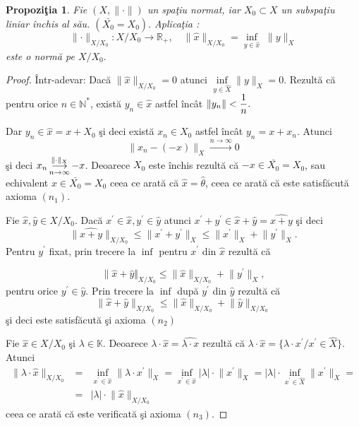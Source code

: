 \documentclass[ a4paper, 12pt]{report}
\newtheorem{prop}[theorem]{\bf Propozi\c tia }
\theoremstyle{definition}
\theoremstyle{remark}
\numberwithin{equation}{section}
\begin{document}
\begin{prop}
Fie $(X,\lVert \cdot \rVert)$ un spa\c tiu normat, iar $X_0 \subset X$ un subspa\c tiu liniar \^inchis al s\u au. $(\bar{X_0} = X_0).$ Aplica\c tia :$$\lVert \cdot \rVert_{X/X_0} : X/X_0 \rightarrow \mathbb{R}_{+}, \quad \lVert \hat{x} \rVert_{X/X_0} = \inf\limits_{y \in \hat{x}} \; \lVert y \rVert_{X} $$ este o norm\u a pe $X/X_0.$
\end{prop}
\begin{proof}
\^Intr-adevar: Dac\u a $\lVert \hat{x} \rVert_{X/X_0} = 0$ atunci $ \inf\limits_{y \in \hat{X}} \lVert y \rVert_{X} = 0$. Rezult\u a c\u a pentru orice $ n \in \mathbb{N^{\ast}}$, exist\u a $ y_n \in \hat{x}$ astfel \^inc\^at $\lVert y_n \rVert < \displaystyle\frac{1}{n}.$

Dar $y_n \in \hat{x} = x + X_0$ \c si deci exist\u a $ x_n \in X_0$ astfel \^inc\^at $y_n = x + x_n$. Atunci
$$ \lVert x_n - (-x) \rVert_{X} \stackrel{n \rightarrow \infty  }{\longrightarrow}0$$ \c si deci $x_n \pound\limits_{n \rightarrow \infty}^{\lVert \cdot \rVert_{X}} -x$. Deoarece  $X_0$ este \^inchis rezult\u a c\u a $ -x \in \bar{X_0} = X_0 $, sau echivalent $ x \in \bar{X_0} = X_0 $ ceea ce arat\u a c\u a
 $ \hat{x} = \hat{\theta}$, ceea ce arat\u a c\u a este satisf\u acut\u a axioma $(n_1).$

\smallskip

Fie $\hat{x},\hat{y} \in X/X_0.$ Dac\u a $x^{'} \in \hat{x}, y^{'} \in \hat{y}$ atunci $ x^{'}+y^{'} \in \hat{x}+\hat{y} = \hat{x + y}$ \c si deci
$$\lVert \hat{x+y} \rVert_{X/X_0} \leq \lVert x^{'}+y^{'} \rVert_{X} \leq \lVert x^{'} \rVert_{X} + \lVert y^{'} \rVert_{X}.$$
Pentru  $y^{'}$ fixat, prin trecere la $\inf$ pentru $ x^{'}$ din $\hat{x}$ rezult\u a c\u a

$$\lVert \hat{x}+\hat{y} \Vert_{X/X_0} \leq \lVert \hat{x} \rVert_{X/X_0} + \lVert y^{'} \rVert_{X},$$ pentru orice $ y^{'} \in \hat{y}.$
Prin trecere la $\inf$ dup\u a $y^{'}$ din $\hat{y}$ rezult\u a c\u a $$ \lVert \hat{x}+\hat{y} \rVert_{X/X_{0}} \leq \lVert \hat{x} \rVert_{X/X_0} + \lVert \hat{y} \rVert_{X/X_0}$$ \c si deci este satisf\u acut\u a \c si axioma $(n_2)$

\smallskip

Fie $\hat{x} \in X/X_0$ \c si $\lambda \in \mathbb{K}.$
Deoarece $\lambda \cdot \hat{x} = \hat{\lambda \cdot x}$ rezult\u a c\u a $ \lambda \cdot \hat{x} = \{ \lambda \cdot x^{'} / x^{'} \in \hat{X} \}$. Atunci
\begin{eqnarray*}
\lVert \lambda \cdot \hat{x} \rVert_{X/X_0} &=& \inf\limits_{x^{'} \in \hat{x}} \lVert \lambda \cdot x^{'} \rVert_{X} = \inf\limits_{x^{'} \in \hat{x}} \lvert \lambda \rvert \cdot \lVert x^{'} \rVert_{X} = \lvert \lambda \rvert \cdot \inf\limits_{x^{'} \in \hat{X}} \lVert x^{'} \rVert_{X} = \\
&=&\lvert \lambda \rvert \cdot \lVert \hat{x} \rVert_{X/X_0}
\end{eqnarray*}
ceea ce arat\u a c\u a este verificat\u a \c si axioma  $(n_3).$
\end{proof}
\end{document}
